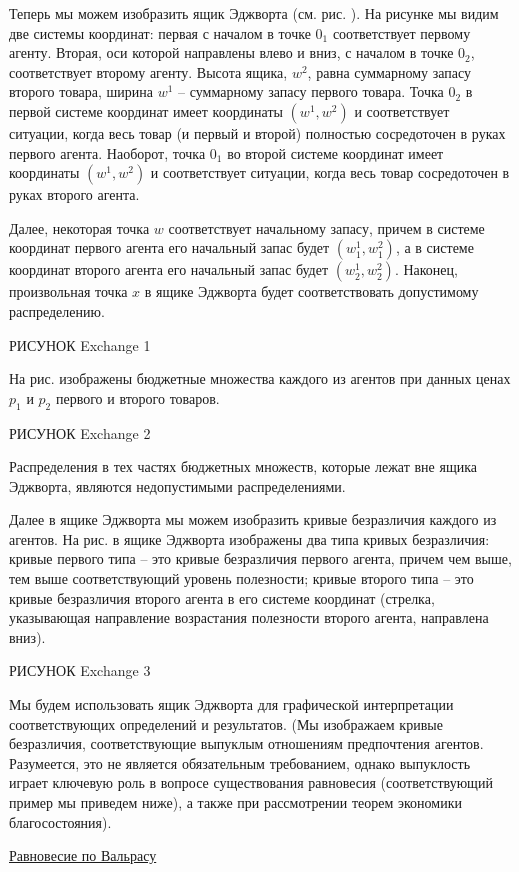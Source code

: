Теперь мы можем изобразить ящик Эджворта (см. рис.   ).
На рисунке мы видим две системы координат: первая с началом в точке $0_1$
соответствует первому агенту. Вторая, оси которой
направлены влево и вниз, с началом в точке $0_2$, соответствует второму агенту.
Высота ящика, $w^2$, равна суммарному запасу второго товара, ширина $w^1$ --
суммарному запасу первого товара. Точка $0_2$ в первой системе координат
имеет координаты $(w^1,w^2)$ и соответствует ситуации, когда весь товар
(и первый и второй) полностью
сосредоточен в руках первого агента. Наоборот, точка $0_1$ во второй системе
координат имеет координаты $(w^1,w^2)$ и соответствует ситуации, когда весь товар
сосредоточен в руках второго агента.

Далее, некоторая точка $w$ соответствует начальному запасу, причем
в системе координат первого агента его начальный запас будет $(w^1_1,w^2_1)$,
а в системе координат второго агента его начальный запас будет $(w^1_2,w^2_2)$.
Наконец, произвольная точка $x$ в ящике Эджворта будет соответствовать
допустимому распределению.


РИСУНОК  Exchange 1


На рис.    изображены бюджетные множества каждого из агентов при данных ценах
$p_1$ и $p_2$ первого и второго товаров.


РИСУНОК  Exchange 2

Распределения в тех частях бюджетных множеств, которые лежат вне ящика Эджворта,
являются недопустимыми распределениями.

Далее в ящике Эджворта мы можем изобразить кривые безразличия каждого из агентов.
На рис.    в ящике Эджворта изображены два типа кривых безразличия:
кривые первого типа -- это кривые безразличия первого агента, причем чем выше,
тем выше соответствующий уровень полезности; кривые второго типа --
это кривые безразличия второго агента в его системе координат (стрелка,
указывающая направление возрастания полезности второго агента, направлена вниз).

РИСУНОК  Exchange 3

Мы будем использовать ящик Эджворта
для графической интерпретации соответствующих определений и результатов.
(Мы изображаем кривые безразличия, соответствующие выпуклым отношениям
предпочтения агентов. Разумеется, это не является обязательным требованием,
однако выпуклость играет ключевую роль в вопросе существования равновесия
(соответствующий пример мы приведем ниже), а также при рассмотрении
теорем экономики благосостояния).

\underline{Равновесие по Вальрасу}

